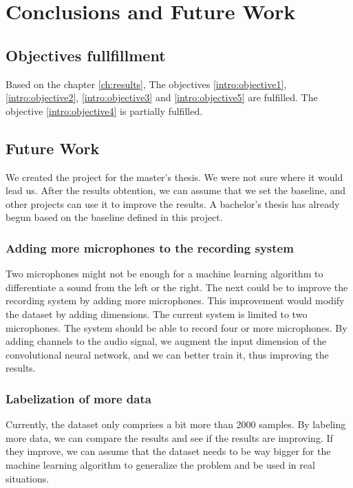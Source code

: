 \chapter{Conclusions and Future Work}
\label{ch:conclusions}

\section{Objectives fullfillment}

Based on the chapter \ref{ch:results}, The objectives \ref{intro:objective1}, \ref{intro:objective2}, \ref{intro:objective3} and \ref{intro:objective5} are fulfilled. The objective \ref{intro:objective4} is partially fulfilled. 

\section{Future Work}

We created the project for the master's thesis. We were not sure where it would lead us. After the results obtention, we can assume that we set the baseline, and other projects can use it to improve the results. A bachelor's thesis has already begun based on the baseline defined in this project. 

\subsection{Adding more microphones to the recording system}


Two microphones might not be enough for a machine learning algorithm to differentiate a sound from the left or the right. The next could be to improve the recording system by adding more microphones. This improvement would modify the dataset by adding dimensions. The current system is limited to two microphones. The system should be able to record four or more microphones. By adding channels to the audio signal, we augment the input dimension of the convolutional neural network, and we can better train it, thus improving the results.

\subsection{Labelization of more data}

Currently, the dataset only comprises a bit more than 2000 samples. By labeling more data, we can compare the results and see if the results are improving. If they improve, we can assume that the dataset needs to be way bigger for the machine learning algorithm to generalize the problem and be used in real situations.

